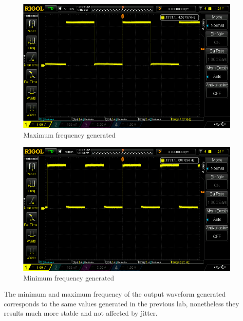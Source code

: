 \documentclass[12pt]{article}
\begin{document}
\begin{figure}[h!]
	\centering
	\includegraphics[scale = 0.4]{immagini/DS1Z_QuickPrint10.png}
	\caption{Maximum frequency generated}
\end{figure}
\begin{figure}[h!]
	\centering
	\includegraphics[scale = 0.4]{immagini/DS1Z_QuickPrint11.png}
	\caption{Minimum frequency generated}
\end{figure}

The minimum and maximum frequency of the output waveform generated corresponds to the same values generated in the previous lab, nonetheless they results much more stable and not affected by jitter.
\end{document}
